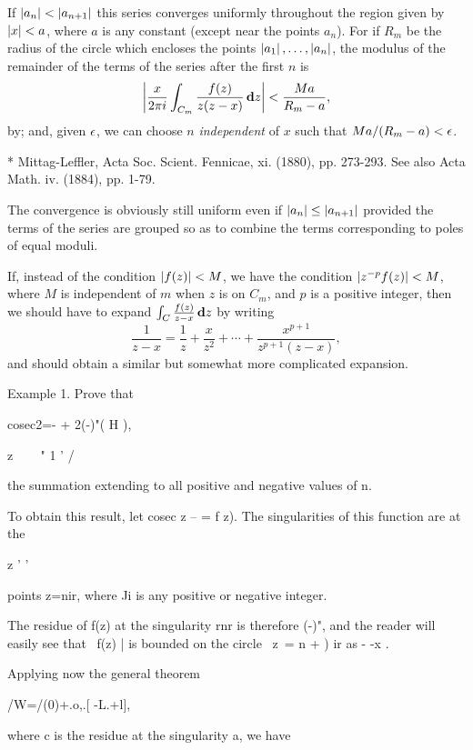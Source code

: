 If $\left| a_{n} \right| < \left| a_{n+1} \right|$ this series converges uniformly
throughout the region given by $\left| x \right| < a$, where $a$ is any constant
(except near the points $a_{n}$).
For if $R_{m}$ be the radius of the circle which encloses the points 
$\left| a_{1} \right|, \ldots, \left| a_{n} \right|$,
the modulus of the remainder of the terms of the series after the first $n$ is
$$
\left|  \frac{x}{2 \pi i}
  \int_{C_{m}} \frac{f(z)}{z(z-x)} \, \mathbf{d} z
 \right|
< \frac{Ma}{R_{m}-a},
$$
by; and, given
$\epsilon$, we can choose $n$ \emph{independent} of $x$
such that $Ma/(R_{m}-a) < \epsilon$.

* Mittag-Leffler, Acta Soc. Scient. Fennicae, xi. (1880), pp. 273-293.
See also Acta Math. iv. (1884), pp. 1-79.

%
%

The convergence is obviously still uniform even if 
$\left| a_{n} \right| \leq \left| a_{n+1} \right|$
provided the terms of the series are grouped so as to combine the
terms corresponding to poles of equal moduli.

If, instead of the condition $\left| f(z) \right| < M$, we have the
condition $\left|  z^{-p} f(z)  \right| < M$,
where $M$ is independent of $m$ when $z$ is on $C_{m}$, and $p$ is
a positive integer, then we should have to
expand $\int_{C} \frac{f(z)}{z-x} \, \mathbf{d} z$ by writing
$$
\frac{1}{z-x}
=
\frac{1}{z}
+ \frac{x}{z^{2}}
+ \cdots
+ \frac{x^{p+1}}{z^{p+1}(z-x)},
$$
and should obtain a similar but somewhat more complicated expansion.

Example 1. Prove that

cosec2=- + 2(-)"( H ),

z \ \ ~ " 1 ' /

the summation extending to all positive and negative values of n.

To obtain this result, let cosec z -- = f z). The singularities of
this function are at the

z ' '

points z=nir, where Ji is any positive or negative integer.

The residue of f(z) at the singularity rnr is therefore (-)", and the
reader will easily see that \ f(z) | is bounded on the circle \ z\ = n
+ ) ir as - -x .

Applying now the general theorem

/W=/(0)+.o,.[ -L.+l],

where c is the residue at the singularity a, we have

